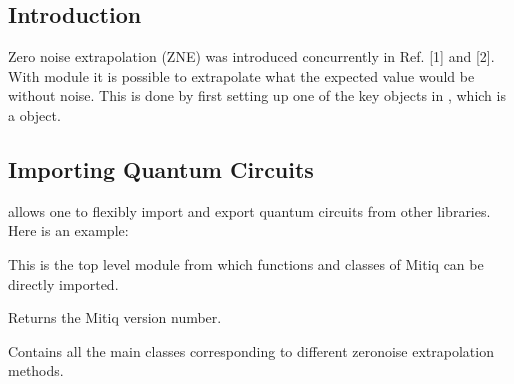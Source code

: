 \documentclass[letterpaper,10pt,english]{sphinxmanual}
\begin{document}
\subsection{Introduction}
\label{\detokenize{guide/guide-zne:introduction}}
Zero noise extrapolation (ZNE) was introduced concurrently in Ref. {[}1{]} and {[}2{]}.
With  module it is possible to extrapolate what the expected value would be without noise. This is done by first setting up one of the key objects in , which is a  object.


\subsection{Importing Quantum Circuits}
\label{\detokenize{guide/guide-zne:importing-quantum-circuits}}
 allows one to flexibly import and export quantum circuits from other libraries. Here is an example:

\begin{sphinxVerbatim}[commandchars=\\\{\}]
   
\end{sphinxVerbatim}
\label{\detokenize{index:module-mitiq}}
This is the top level module from which functions and classes of
Mitiq can be directly imported.

\begin{fulllineitems}
\label{\detokenize{index:mitiq.version}}
Returns the Mitiq version number.

\end{fulllineitems}

\label{\detokenize{index:module-mitiq.factories}}
Contains all the main classes corresponding to different zero\sphinxhyphen{}noise extrapolation methods.
\end{document}
